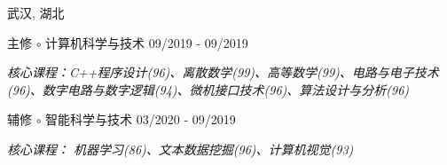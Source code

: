 \vspace{-6.0mm}

\begin{cventries}
\vspace{-1.5mm}
\cveducation
{}
{武汉, 湖北}

\cvsubeducation
{主修 $\circ$ 计算机科学与技术}
{09/2019 - 09/2019}
{
    \begin{cvitems}
    \item {\itshape{核心课程：C++程序设计(96)、离散数学(99)、高等数学(99)、电路与电子技术(96)、数字电路与数字逻辑(94)、微机接口技术(96)、算法设计与分析(96)}}
    \end{cvitems}
}
\vspace{-1.0mm}

\cvsubeducation
{辅修 $\circ$ 智能科学与技术}
{03/2020 - 09/2019}
{
    \begin{cvitems}
    \item {\itshape{核心课程： 机器学习(86)、文本数据挖掘(96)、计算机视觉(93)}}
    \end{cvitems}
}




\end{cventries}